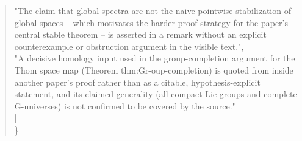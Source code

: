 \documentclass[11pt]{article}
\begin{document}
\begin{quote}
    "The claim that global spectra are not the naive pointwise stabilization of global spaces -- which motivates the harder proof strategy for the paper's central stable theorem -- is asserted in a remark without an explicit counterexample or obstruction argument in the visible text.",\\
    "A decisive homology input used in the group-completion argument for the Thom space map (Theorem thm:Gr-oup-completion) is quoted from inside another paper's proof rather than as a citable, hypothesis-explicit statement, and its claimed generality (all compact Lie groups and complete G-universes) is not confirmed to be covered by the source."\\
  ]\\
\}\\
\end{quote}
\end{document}

